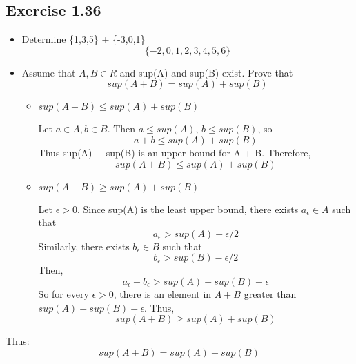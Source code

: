 \documentclass[12pt]{article}
\begin{document}
		\subsection*{Exercise 1.36}
			\begin{itemize}
				\item Determine \{1,3,5\} + \{-3,0,1\}
					\begin{equation}
						\{-2,0,1,2,3,4,5,6\}
					\end{equation}
				\item Assume that $A,B \in R$ and sup(A) and sup(B) exist. Prove that
				\begin{equation}
					sup(A+B) = sup(A) + sup(B)
				\end{equation}
				
				\begin{itemize}
					\item $sup(A+B) \le sup(A) + sup(B)$
					
						Let $a \in A, b \in B$. Then $a \le sup(A)$, $b \le sup(B)$, so
						\begin{equation}
							a + b \le sup(A) + sup(B)
						\end{equation}
						Thus sup(A) + sup(B) is an upper bound for A + B. Therefore,
						\begin{equation}
							sup(A+B) \le sup(A) + sup(B)
						\end{equation}
					\item $sup(A+B) \ge sup(A) + sup(B)$
					
						Let $\epsilon > 0$. Since sup(A) is the least upper bound, there exists $a_{\epsilon} \in A$ such that
						\begin{equation}
							a_{\epsilon} > sup(A) - \epsilon / 2
						\end{equation}
						Similarly, there exists $b_{\epsilon} \in B$ such that
						\begin{equation}
							b_{\epsilon} > sup(B) - \epsilon / 2
						\end{equation}
						Then,
						\begin{equation}
							a_{\epsilon} + b_{\epsilon} > sup(A) + sup(B) - \epsilon
						\end{equation}
						So for every $\epsilon > 0$, there is an element in $A + B$ greater than $sup(A) + sup(B) - \epsilon$. Thus,
						\begin{equation}
							sup(A + B) \ge sup(A) + sup(B)
						\end{equation}
				\end{itemize}
			\end{itemize}
			Thus:
			\begin{equation}
				sup(A+B) = sup(A) + sup(B)
			\end{equation}
\end{document}

